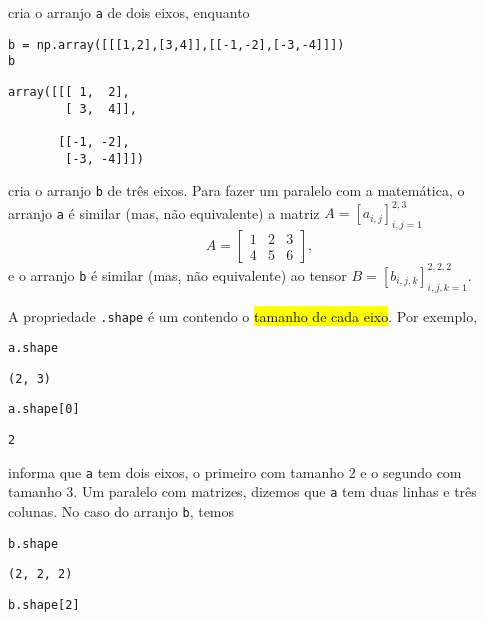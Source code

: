 cria o arranjo \lstinline+a+ de dois eixos, enquanto

\begin{lstlisting}
b = np.array([[[1,2],[3,4]],[[-1,-2],[-3,-4]]])
b
\end{lstlisting}

\begin{verbatim}
array([[[ 1,  2],
        [ 3,  4]],

       [[-1, -2],
        [-3, -4]]])
\end{verbatim}

cria o arranjo \lstinline+b+ de três eixos. Para fazer um paralelo com a matemática, o arranjo \lstinline+a+ é similar (mas, não equivalente) a matriz $A = [a_{i,j}]_{i,j=1}^{2,3}$
\begin{equation}
  A =
  \begin{bmatrix}
    1 & 2 & 3\\
    4 & 5 & 6
  \end{bmatrix},
\end{equation}
e o arranjo \lstinline+b+ é similar (mas, não equivalente) ao tensor $B = [b_{i,j,k}]_{i,j,k=1}^{2,2,2}$.

A propriedade \lstinline+.shape+ é um {\PYTHONtuple} contendo o \hl{tamanho de cada eixo}. Por exemplo,

\begin{lstlisting}
a.shape
\end{lstlisting}

\begin{verbatim}
(2, 3)
\end{verbatim}

\begin{lstlisting}
a.shape[0]
\end{lstlisting}

\begin{verbatim}
2
\end{verbatim}


informa que \lstinline+a+ tem dois eixos, o primeiro com tamanho $2$ e o segundo com tamanho $3$. Um paralelo com matrizes, dizemos que \lstinline+a+ tem duas linhas e três colunas. No caso do arranjo \lstinline+b+, temos

\begin{lstlisting}
b.shape
\end{lstlisting}

\begin{verbatim}
(2, 2, 2)
\end{verbatim}

\begin{lstlisting}
b.shape[2]
\end{lstlisting}

